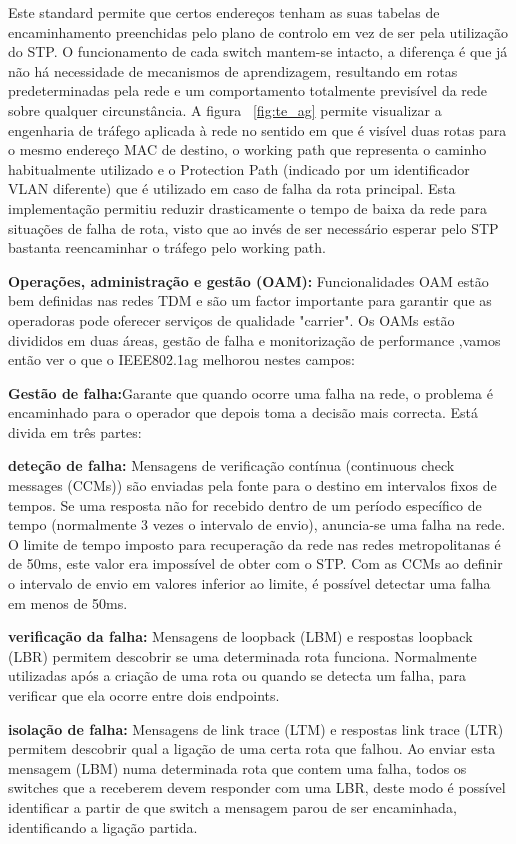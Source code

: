\documentclass[a4paper]{IEEEtran}
\begin{document}
Este standard permite que certos endereços tenham as suas tabelas de encaminhamento preenchidas pelo plano de controlo em vez de ser pela utilização do STP. O funcionamento de cada switch mantem-se intacto, a diferença é que já não há necessidade de mecanismos de aprendizagem, resultando em rotas predeterminadas pela rede e um comportamento totalmente previsível da rede sobre qualquer circunstância.
A figura ~\ref{fig:te_ag} permite visualizar a engenharia de tráfego aplicada à rede no sentido em que é visível duas rotas para o mesmo endereço MAC de destino, o working path que representa o caminho habitualmente utilizado e o Protection Path (indicado por um identificador VLAN diferente) que é utilizado em caso de falha da rota principal. Esta implementação permitiu reduzir drasticamente o tempo de baixa da rede para situações de falha de rota, visto que ao invés de ser necessário esperar pelo STP bastanta reencaminhar o tráfego pelo working path.

\textbf{Operações, administração e gestão (OAM):} Funcionalidades OAM estão bem definidas nas redes TDM e são um factor importante para garantir que as operadoras pode oferecer serviços de qualidade "carrier". Os OAMs estão divididos em duas áreas, gestão de falha e monitorização de performance ,vamos então ver o que o IEEE802.1ag melhorou nestes campos:

\textbf{Gestão de falha:}Garante que quando ocorre uma falha na rede, o problema é encaminhado para o operador que depois toma a decisão mais correcta. Está divida em três partes:

\textbf{deteção de falha:} Mensagens de verificação contínua (continuous check messages (CCMs)) são enviadas pela fonte para o destino em intervalos fixos de tempos. Se uma resposta não for recebido dentro de um período específico de tempo (normalmente 3 vezes o intervalo de envio), anuncia-se uma falha na rede. O limite de tempo imposto para recuperação da rede nas redes metropolitanas é de 50ms, este valor era impossível de obter com o STP. Com as CCMs ao definir o intervalo de envio em valores inferior ao limite, é possível detectar uma falha em menos de 50ms.

\textbf{verificação da falha:} Mensagens de loopback (LBM) e respostas loopback (LBR) permitem descobrir se uma determinada rota funciona. Normalmente utilizadas após a criação de uma rota ou quando se detecta um falha, para verificar que ela ocorre entre dois endpoints.

\textbf{isolação de falha:} Mensagens de link trace (LTM) e respostas link trace (LTR) permitem descobrir qual a ligação de uma certa rota que falhou. Ao enviar esta mensagem (LBM) numa determinada rota que contem uma falha, todos os switches que a receberem devem responder com uma LBR, deste modo é possível identificar a partir de que switch a mensagem parou de ser encaminhada, identificando a ligação partida.
\end{document}
